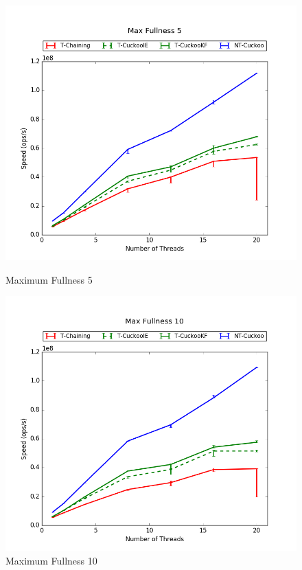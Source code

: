 \begin{figure}[H]
    \centering
	\begin{minipage}{0.45\textwidth}\includegraphics[width=\textwidth]{maps/5HM10K:F90,I5,E5.png} 
        \caption*{Maximum Fullness 5}
    \end{minipage}
	\begin{minipage}{0.45\textwidth}\includegraphics[width=\textwidth]{maps/10HM10K:F90,I5,E5.png} 
        \caption*{Maximum Fullness 10}

\end{minipage}
\end{figure}
